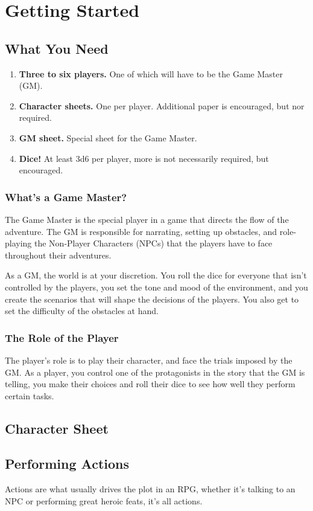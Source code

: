 \chapter{Getting Started}
\section{What You Need}
\begin{enumerate}
    \item \textbf{Three to six players.} One of which will have to be the Game Master (GM).
    \item \textbf{Character sheets.} One per player. Additional paper is encouraged, but nor required.
    \item \textbf{GM sheet.} Special sheet for the Game Master.
    \item \textbf{Dice!} At least 3d6 per player, more is not necessarily required, but encouraged.
\end{enumerate}

\subsection{What's a Game Master?}
The Game Master is the special player in a game that directs the flow of the adventure.
The GM is responsible for narrating, setting up obstacles, and role-playing the Non-Player Characters (NPCs) that the players have to face throughout their adventures.

As a GM, the world is at your discretion. 
You roll the dice for everyone that isn't controlled by the players, you set the tone and mood of the environment, and you create the scenarios that will shape the decisions of the players.
You also get to set the difficulty of the obstacles at hand.

\subsection{The Role of the Player}
The player's role is to play their character, and face the trials imposed by the GM.
As a player, you control one of the protagonists in the story that the GM is telling, you make their choices and roll their dice to see how well they perform certain tasks.

\section{Character Sheet}

\section{Performing Actions}
Actions are what usually drives the plot in an RPG, whether it's talking to an NPC or performing great heroic feats, it's all actions.

